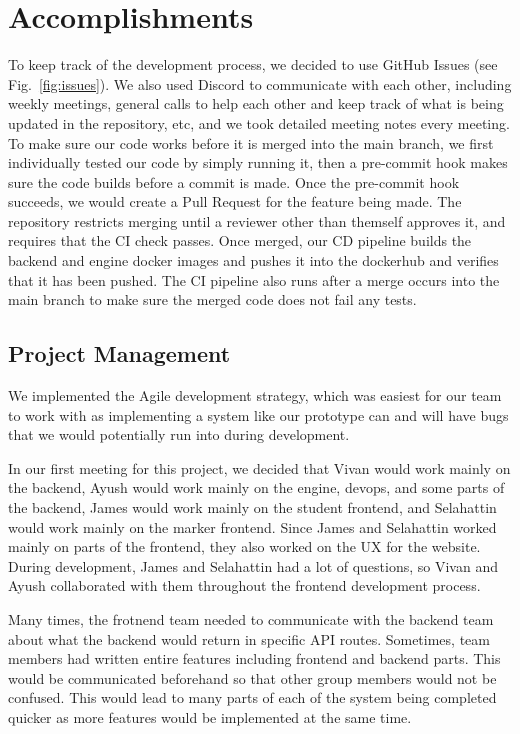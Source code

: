 \documentclass[a4paper, 12pt]{article}
\begin{document}
\section*{Accomplishments}
To keep track of the development process, we decided to use GitHub Issues (see Fig.~\ref{fig:issues}). We also used Discord to communicate with each other, including weekly meetings, general calls to help each other and keep track of what is being updated in the repository, etc, and we took detailed meeting notes every meeting. To make sure our code works before it is merged into the main branch, we first individually tested our code by simply running it, then a pre-commit hook makes sure the code builds before a commit is made. Once the pre-commit hook succeeds, we would create a Pull Request for the feature being made. The repository restricts merging until a reviewer other than themself approves it, and requires that the CI check passes. Once merged, our CD pipeline builds the backend and engine docker images and pushes it into the dockerhub and verifies that it has been pushed. The CI pipeline also runs after a merge occurs into the main branch to make sure the merged code does not fail any tests.

\subsection*{Project Management}
We implemented the Agile development strategy, which was easiest for our team to work with as implementing a system like our prototype can and will have bugs that we would potentially run into during development.

In our first meeting for this project, we decided that Vivan would work mainly on the backend, Ayush would work mainly on the engine, devops, and some parts of the backend, James would work mainly on the student frontend, and Selahattin would work mainly on the marker frontend. Since James and Selahattin worked mainly on parts of the frontend, they also worked on the UX for the website. During development, James and Selahattin had a lot of questions, so Vivan and Ayush collaborated with them throughout the frontend development process.

Many times, the frotnend team needed to communicate with the backend team about what the backend would return in specific API routes. Sometimes, team members had written entire features including frontend and backend parts. This would be communicated beforehand so that other group members would not be confused. This would lead to many parts of each of the system being completed quicker as more features would be implemented at the same time.
\end{document}
